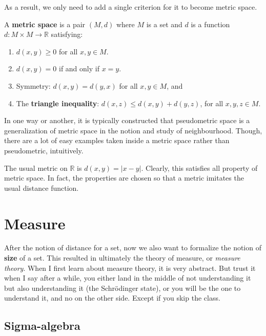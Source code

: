 As a result, we only need to add a single criterion for it to become metric space. 

\begin{definition}
    A \textbf{metric space} is a pair $(M,d)$ where $M$ is a set and $d$ is a function $d:M\times M\to \mathbb{R}$ satisfying: 
    \begin{enumerate}
        \item $d(x,y)\geq 0$ for all $x,y\in M$. 
        \item $d(x,y)=0$ if and only if $x=y$. 
        \item Symmetry: $d(x,y)=d(y,x)$ for all $x,y\in M$, and 
        \item The \textbf{triangle inequality}: $d(x,z)\leq d(x,y)+d(y,z)$, for all $x,y,z\in M$. 
    \end{enumerate}
\end{definition}

In one way or another, it is typically constructed that pseudometric space is a generalization of metric space in the notion and study of neighbourhood. Though, there are a lot of easy examples taken inside a metric space rather than pseudometric, intuitively. 

\begin{example}
    The usual metric on $\mathbb{R}$ is $d(x,y)=\lvert x-y\rvert$. Clearly, this satisfies all property of metric space. In fact, the properties are chosen so that a metric imitates the usual distance function.  
\end{example}



\section{Measure}

After the notion of distance for a set, now we also want to formalize the notion of \textbf{size} of a set. This resulted in ultimately the theory of measure, or \textit{measure theory}. When I first learn about measure theory, it is very abstract. But trust it when I say after a while, you either land in the middle of not understanding it but also understanding it (the Schrödinger state), or you will be the one to understand it, and no on the other side. Except if you skip the class. 

\subsection{Sigma-algebra}

